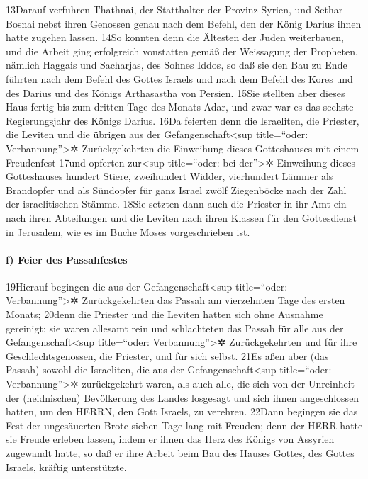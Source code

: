 13Darauf verfuhren Thathnai, der Statthalter der Provinz Syrien, und
Sethar-Bosnai nebst ihren Genossen genau nach dem Befehl, den der König
Darius ihnen hatte zugehen lassen. 14So konnten denn die Ältesten der
Juden weiterbauen, und die Arbeit ging erfolgreich vonstatten gemäß der
Weissagung der Propheten, nämlich Haggais und Sacharjas, des Sohnes
Iddos, so daß sie den Bau zu Ende führten nach dem Befehl des Gottes
Israels und nach dem Befehl des Kores und des Darius und des Königs
Arthasastha von Persien. 15Sie stellten aber dieses Haus fertig bis zum
dritten Tage des Monats Adar, und zwar war es das sechste Regierungsjahr
des Königs Darius. 16Da feierten denn die Israeliten, die Priester, die
Leviten und die übrigen aus der Gefangenschaft\textless sup
title=``oder: Verbannung''\textgreater✲ Zurückgekehrten die Einweihung
dieses Gotteshauses mit einem Freudenfest 17und opferten
zur\textless sup title=``oder: bei der''\textgreater✲ Einweihung dieses
Gotteshauses hundert Stiere, zweihundert Widder, vierhundert Lämmer als
Brandopfer und als Sündopfer für ganz Israel zwölf Ziegenböcke nach der
Zahl der israelitischen Stämme. 18Sie setzten dann auch die Priester in
ihr Amt ein nach ihren Abteilungen und die Leviten nach ihren Klassen
für den Gottesdienst in Jerusalem, wie es im Buche Moses vorgeschrieben
ist.

\hypertarget{f-feier-des-passahfestes}{%
\paragraph{f) Feier des Passahfestes}\label{f-feier-des-passahfestes}}

19Hierauf begingen die aus der Gefangenschaft\textless sup title=``oder:
Verbannung''\textgreater✲ Zurückgekehrten das Passah am vierzehnten Tage
des ersten Monats; 20denn die Priester und die Leviten hatten sich ohne
Ausnahme gereinigt; sie waren allesamt rein und schlachteten das Passah
für alle aus der Gefangenschaft\textless sup title=``oder:
Verbannung''\textgreater✲ Zurückgekehrten und für ihre
Geschlechtsgenossen, die Priester, und für sich selbst. 21Es aßen aber
(das Passah) sowohl die Israeliten, die aus der
Gefangenschaft\textless sup title=``oder: Verbannung''\textgreater✲
zurückgekehrt waren, als auch alle, die sich von der Unreinheit der
(heidnischen) Bevölkerung des Landes losgesagt und sich ihnen
angeschlossen hatten, um den HERRN, den Gott Israels, zu verehren.
22Dann begingen sie das Fest der ungesäuerten Brote sieben Tage lang mit
Freuden; denn der HERR hatte sie Freude erleben lassen, indem er ihnen
das Herz des Königs von Assyrien zugewandt hatte, so daß er ihre Arbeit
beim Bau des Hauses Gottes, des Gottes Israels, kräftig unterstützte.

